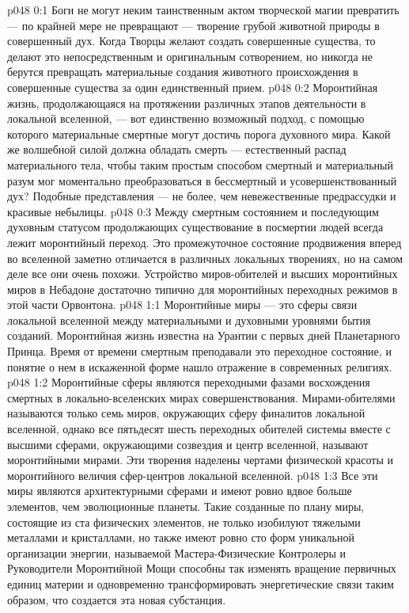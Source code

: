 \author{Архангел}
\vs p048 0:1 Боги не могут неким таинственным актом творческой магии превратить --- по крайней мере не превращают --- творение грубой животной природы в совершенный дух. Когда Творцы желают создать совершенные существа, то делают это непосредственным и оригинальным сотворением, но никогда не берутся превращать материальные создания животного происхождения в совершенные существа за один единственный прием.
\vs p048 0:2 Моронтийная жизнь, продолжающаяся на протяжении различных этапов деятельности в локальной вселенной, --- вот единственно возможный подход, с помощью которого материальные смертные могут достичь порога духовного мира. Какой же волшебной силой должна обладать смерть --- естественный распад материального тела, чтобы таким простым способом смертный и материальный разум мог моментально преобразоваться в бессмертный и усовершенствованный дух? Подобные представления --- не более, чем невежественные предрассудки и красивые небылицы.
\vs p048 0:3 Между смертным состоянием и последующим духовным статусом продолжающих существование в посмертии людей всегда лежит моронтийный переход. Это промежуточное состояние продвижения вперед во вселенной заметно отличается в различных локальных творениях, но на самом деле все они очень похожи. Устройство миров\hyp{}обителей и высших моронтийных миров в Небадоне достаточно типично для моронтийных переходных режимов в этой части Орвонтона.
\vs p048 1:1 Моронтийные миры --- это сферы связи локальной вселенной между материальными и духовными уровнями бытия созданий. Моронтийная жизнь известна на Урантии с первых дней Планетарного Принца. Время от времени смертным преподавали это переходное состояние, и понятие о нем в искаженной форме нашло отражение в современных религиях.
\vs p048 1:2 Моронтийные сферы являются переходными фазами восхождения смертных в локально\hyp{}вселенских мирах совершенствования. Мирами\hyp{}обителями называются только семь миров, окружающих сферу финалитов локальной вселенной, однако все пятьдесят шесть переходных обителей системы вместе с высшими сферами, окружающими созвездия и центр вселенной, называют моронтийными мирами. Эти творения наделены чертами физической красоты и моронтийного величия сфер\hyp{}центров локальной вселенной.
\vs p048 1:3 Все эти миры являются архитектурными сферами и имеют ровно вдвое больше элементов, чем эволюционные планеты. Такие созданные по плану миры, состоящие из ста физических элементов, не только изобилуют тяжелыми металлами и кристаллами, но также имеют ровно сто форм уникальной организации энергии, называемой  Мастера\hyp{}Физические Контролеры и Руководители Моронтийной Мощи способны так изменять вращение первичных единиц материи и одновременно трансформировать энергетические связи таким образом, что создается эта новая субстанция.
